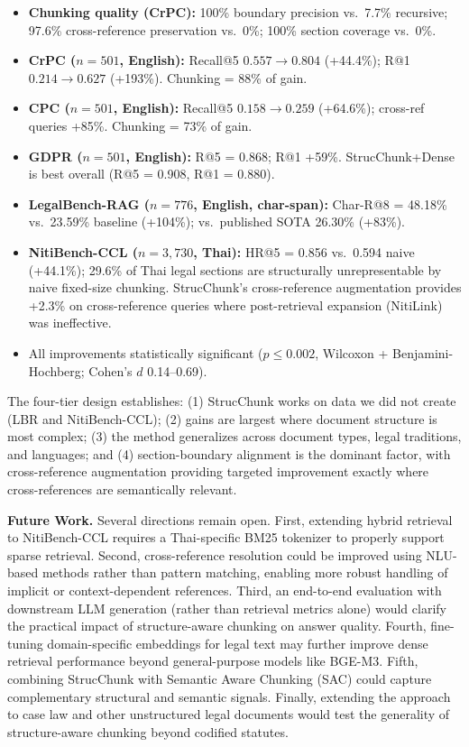 \documentclass[sn-mathphys,Numbered]{sn-jnl}%
\begin{document}
\begin{itemize}
\item \textbf{Chunking quality (CrPC):} 100\% boundary precision vs.\
      7.7\% recursive; 97.6\% cross-reference preservation vs.\ 0\%;
      100\% section coverage vs.\ 0\%.
\item \textbf{CrPC ($n=501$, English):} Recall@5 $0.557 \to 0.804$
      (+44.4\%); R@1 $0.214 \to 0.627$ (+193\%).  Chunking = 88\% of gain.
\item \textbf{CPC ($n=501$, English):} Recall@5 $0.158 \to 0.259$
      (+64.6\%); cross-ref queries +85\%.  Chunking = 73\% of gain.
\item \textbf{GDPR ($n=501$, English):} R@5 = 0.868; R@1 +59\%.
      StrucChunk+Dense is best overall (R@5 = 0.908, R@1 = 0.880).
\item \textbf{LegalBench-RAG ($n=776$, English, char-span):} Char-R@8 =
      48.18\% vs.\ 23.59\% baseline (+104\%); vs.\ published SOTA
      26.30\% (+83\%).
\item \textbf{NitiBench-CCL ($n=3{,}730$, Thai):} HR@5 = 0.856 vs.\
      0.594 naive (+44.1\%); 29.6\% of Thai legal sections are
      structurally unrepresentable by naive fixed-size chunking.
      StrucChunk's cross-reference augmentation provides +2.3\% on
      cross-reference queries where post-retrieval expansion (NitiLink)
      was ineffective.
\item All improvements statistically significant ($p \leq 0.002$,
      Wilcoxon + Benjamini-Hochberg; Cohen's $d$ 0.14--0.69).
\end{itemize}

The four-tier design establishes: (1) StrucChunk works on data we did not
create (LBR and NitiBench-CCL); (2) gains are largest where document
structure is most complex; (3) the method generalizes across document
types, legal traditions, and languages; and (4) section-boundary alignment
is the dominant factor, with cross-reference augmentation providing
targeted improvement exactly where cross-references are semantically
relevant.

\textbf{Future Work.} Several directions remain open. First, extending hybrid retrieval to NitiBench-CCL requires a Thai-specific BM25 tokenizer to properly support sparse retrieval. Second, cross-reference resolution could be improved using NLU-based methods rather than pattern matching, enabling more robust handling of implicit or context-dependent references. Third, an end-to-end evaluation with downstream LLM generation (rather than retrieval metrics alone) would clarify the practical impact of structure-aware chunking on answer quality. Fourth, fine-tuning domain-specific embeddings for legal text may further improve dense retrieval performance beyond general-purpose models like BGE-M3. Fifth, combining StrucChunk with Semantic Aware Chunking (SAC) could capture complementary structural and semantic signals. Finally, extending the approach to case law and other unstructured legal documents would test the generality of structure-aware chunking beyond codified statutes.
\end{document}
